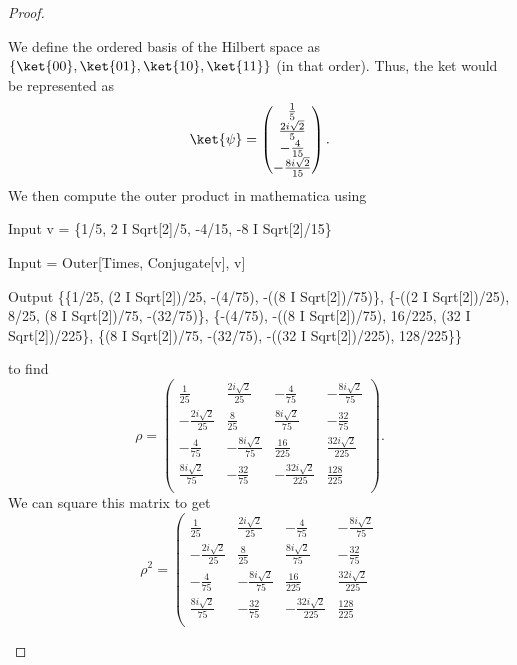 \begin{proof}
	\begin{parts}
	\item We define the ordered basis of the Hilbert space as $\{\ket{00}, \ket{01}, \ket{10}, \ket{11}\} $ (in that order). Thus, the ket would be represented as
		\[
		\ket{\psi} = \begin{pmatrix} \frac{1}{5}\\ \frac{2i\sqrt{2} }{5} \\ -\frac{4}{15}\\ -\frac{8i\sqrt{2} }{15} \end{pmatrix} 
		.\] 
		We then compute the outer product in mathematica using
		\begin{mmaCell}{Input}
v = \{1/5, 2 I Sqrt[2]/5, -4/15, -8 I Sqrt[2]/15\}
		\end{mmaCell}
		\begin{mmaCell}{Input}
\mmaUnd{\(\rho\)} = Outer[Times, Conjugate[v], v]
		\end{mmaCell}
		\begin{mmaCell}{Output}
\{\{1/25, (2 I Sqrt[2])/25, -(4/75), -((8 I Sqrt[2])/75)\}, \{-((2 I Sqrt[2])/25), 8/25, (8 I Sqrt[2])/75, -(32/75)\}, \{-(4/75), -((8 I Sqrt[2])/75), 16/225, (32 I Sqrt[2])/225\}, \{(8 I Sqrt[2])/75, -(32/75), -((32 I Sqrt[2])/225), 128/225\}\}
		\end{mmaCell}
		to find
		\[
		\rho =\left(
\begin{array}{cccc}
 \frac{1}{25} & \frac{2 i \sqrt{2}}{25} & -\frac{4}{75} & -\frac{8 i \sqrt{2}}{75} \\
 -\frac{2 i \sqrt{2}}{25} & \frac{8}{25} & \frac{8 i \sqrt{2}}{75} & -\frac{32}{75} \\
 -\frac{4}{75} & -\frac{8 i \sqrt{2}}{75} & \frac{16}{225} & \frac{32 i \sqrt{2}}{225} \\
 \frac{8 i \sqrt{2}}{75} & -\frac{32}{75} & -\frac{32 i \sqrt{2}}{225} & \frac{128}{225} \\
\end{array}
\right) 
		.\] 
		We can square this matrix to get
		\[
		\rho^2 =\left(
\begin{array}{cccc}
 \frac{1}{25} & \frac{2 i \sqrt{2}}{25} & -\frac{4}{75} & -\frac{8 i \sqrt{2}}{75} \\
 -\frac{2 i \sqrt{2}}{25} & \frac{8}{25} & \frac{8 i \sqrt{2}}{75} & -\frac{32}{75} \\
 -\frac{4}{75} & -\frac{8 i \sqrt{2}}{75} & \frac{16}{225} & \frac{32 i \sqrt{2}}{225} \\
 \frac{8 i \sqrt{2}}{75} & -\frac{32}{75} & -\frac{32 i \sqrt{2}}{225} & \frac{128}{225} \\

\end{array}\]
\end{parts}
\end{proof}
